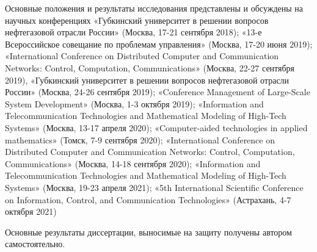 


{\probation}
Основные положения и результаты исследования представлены и обсуждены на научных конференциях «Губкинский университет в решении вопросов нефтегазовой отрасли России» (Москва, 17-21 сентября 2018); «13-е Всероссийское совещание по проблемам управления» (Москва, 17-20 июня 2019); «International Conference on Distributed Computer and Communication Networks: Control, Computation, Communications» (Москва, 22-27 сентября 2019), «Губкинский университет в решении вопросов нефтегазовой отрасли России» (Москва, 24-26 сентября 2019); «Conference Management of Large-Scale System Development» (Москва, 1-3 октября 2019); «Information and Telecommunication Technologies and Mathematical Modeling of High-Tech Systems» (Москва, 13-17 апреля 2020); «Computer-aided technologies in applied mathematics» (Томск, 7-9 сентября 2020); «International Conference on Distributed Computer and Communication Networks: Control, Computation, Communications» (Москва, 14-18 сентября 2020); «Information and Telecommunication Technologies and Mathematical Modeling of High-Tech Systems» (Москва, 19-23 апреля 2021);  «5th International Scientific Conference on Information, Control, and Communication Technologies» (Астрахань, 4-7 октября 2021)


{\contribution} Основные результаты диссертации, выносимые на защиту получены автором самостоятельно.

